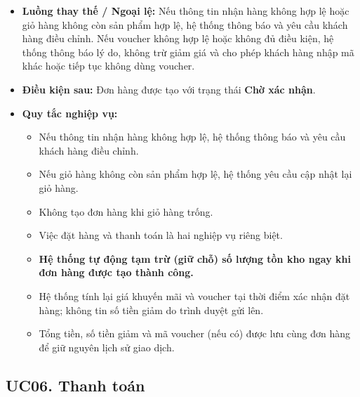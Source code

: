 \documentclass[12pt,a4paper]{article}
\begin{document}
\begin{itemize}
\begin{enumerate}
  \item Khách hàng xác nhận đặt hàng.

  \item Hệ thống tạo đơn hàng với trạng thái Chờ xác nhận.

 \end{enumerate}

  \item \textbf{Luồng thay thế / Ngoại lệ:} Nếu thông tin nhận hàng không hợp lệ hoặc giỏ hàng không còn sản phẩm hợp lệ, hệ thống thông báo và yêu cầu khách hàng điều chỉnh. Nếu voucher không hợp lệ hoặc không đủ điều kiện, hệ thống thông báo lý do, không trừ giảm giá và cho phép khách hàng nhập mã khác hoặc tiếp tục không dùng voucher.

 \item \textbf{Điều kiện sau:} Đơn hàng được tạo với trạng thái \textbf{Chờ xác nhận}.

 \item \textbf{Quy tắc nghiệp vụ:}
\begin{itemize}

\item Nếu thông tin nhận hàng không hợp lệ, hệ thống thông báo và yêu cầu khách hàng điều chỉnh.
\item Nếu giỏ hàng không còn sản phẩm hợp lệ, hệ thống yêu cầu cập nhật lại giỏ hàng.
\item Không tạo đơn hàng khi giỏ hàng trống.
\item Việc đặt hàng và thanh toán là hai nghiệp vụ riêng biệt.
\item \textbf{Hệ thống tự động tạm trừ (giữ chỗ) số lượng tồn kho ngay khi đơn hàng được tạo thành công.}
\item Hệ thống tính lại giá khuyến mãi và voucher tại thời điểm xác nhận đặt hàng; không tin số tiền giảm do trình duyệt gửi lên.
\item Tổng tiền, số tiền giảm và mã voucher (nếu có) được lưu cùng đơn hàng để giữ nguyên lịch sử giao dịch.
\end{itemize}

\end{itemize}


\subsection{UC06. Thanh toán}
\end{document}
